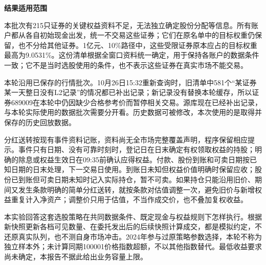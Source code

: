 \documentclass[UTF8,fontset=fandol,11pt,a4paper]{ctexart}
\newcommand{\lead}[1]{\par\medskip\Needspace{3\baselineskip}\noindent\textbf{#1}\par\smallskip}
\begin{document}
\lead{结果适用范围}
本批次有215只证券的关键权益资料不足，无法独立确定股份分配等信息。所有账户都从各自初始现金出发，统一不交易这些证券；它们在原名单中的目标权重仍保留，也不分给其他证券。1亿元、10\%路径中，这些受限证券原本应占的目标权重最高为9.0531\%。这份清单根据全窗口资料统一确定，用于保持各账户的数据条件一致；它不是当时选股使用的条件，也不表示这些证券在真实市场不能交易。

本轮沿用已保存的行情批次。10月26日15:32重新查询时，旧清单中581个“某证券某一天整日没有L2记录”的情况都已补出记录；新记录没有替换本轮缓存，所以证券689009在本轮中仍因缺少合格参考价而暂停相关交易。源库现在已经补出记录，与本轮实际使用的数据批次需要分开看。历史数据可被修改，本次使用的是取得并保存的历史回放数据。

分红送转按现有事件资料记账，资料尚无全市场完整覆盖声明，程序保留相应提示。事件只有日期、没有可靠时刻时，登记日在日末确定有权领取权益的持股；明确的除息或权益生效日在09:35前确认应得权益。付款、股份到账和可卖日期按已知日期的日末处理，下一交易日使用。到账日未知但权益价值明确时保留应收；股份已到账但可卖日期未知时记入实际持仓，暂不可卖。如果持仓只能沿用旧价、期间又发生条款明确的简单分红送转，就按条款对估值调整一次，避免旧价与新增权益重复计入净资产；调整价只用于估值，不当作成交价，也不叠加复权收益。

本实验回答这套选股策略在共同数据条件、既定现金与权益规则下怎样执行。根据新快照更新各档可见数量、在委托发出后的后续快照计算成交，都是模拟约定，不还原真实队列，也不测自身市场冲击。2024年参与过原策略参数选择，本轮不称为独立样本外；未计算同期100001价格指数超额，不以其他指数替代。最低收益要求尚未确定，本报告不据此给出业务容量上限。
\end{document}
